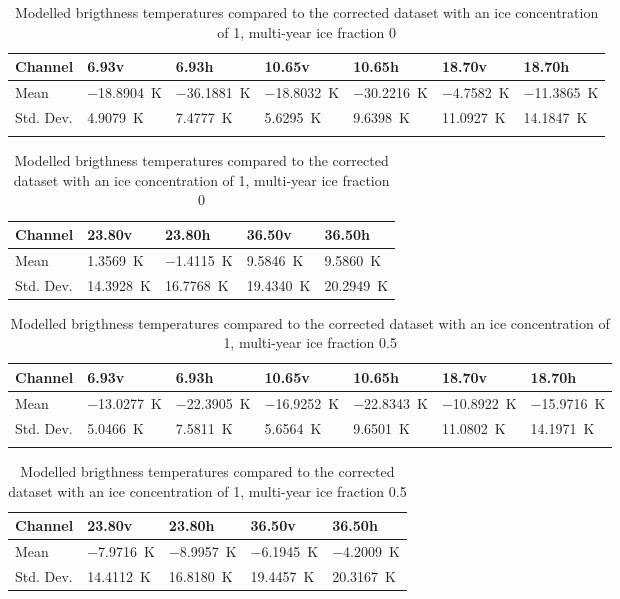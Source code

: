 \documentclass[11pt, a4paper]{article}
\begin{document}
\begin{table}[h!]
\centering
\begin{tabular}{@{} l l l l l l l @{}}
Channel & 6.93v & 6.93h & 10.65v & 10.65h & 18.70v & 18.70h \\
\midrule
Mean & \SI{-18.8904}{K} & \SI{-36.1881}{K} & \SI{-18.8032}{K} & \SI{-30.2216}{K} & \SI{-4.7582}{K} & \SI{-11.3865}{K} \\
Std. Dev. & \SI{4.9079}{K} & \SI{7.4777}{K} & \SI{5.6295}{K} & \SI{9.6398}{K} & \SI{11.0927}{K} & \SI{14.1847}{K} \\
\midrule
\tabularnewline
\end{tabular}
\begin{tabular}{@{} l l l l l @{}}
Channel & 23.80v & 23.80h & 36.50v & 36.50h \\
\midrule
Mean & \SI{1.3569}{K} & \SI{-1.4115}{K} & \SI{9.5846}{K} & \SI{9.5860}{K} \\
Std. Dev. & \SI{14.3928}{K} & \SI{16.7768}{K} & \SI{19.4340}{K} & \SI{20.2949}{K} \\
\midrule
\end{tabular}
\caption{Modelled brigthness temperatures compared to the corrected dataset with an ice concentration of 1, multi-year ice fraction 0}
\label{tab:for1_0}
\end{table}



\begin{table}[h!]
\centering
\begin{tabular}{@{} l l l l l l l @{}}
Channel & 6.93v & 6.93h & 10.65v & 10.65h & 18.70v & 18.70h \\
\midrule
Mean & \SI{-13.0277}{K} & \SI{-22.3905}{K} & \SI{-16.9252}{K} & \SI{-22.8343}{K} & \SI{-10.8922}{K} & \SI{-15.9716}{K} \\
Std. Dev. & \SI{5.0466}{K} & \SI{7.5811}{K} & \SI{5.6564}{K} & \SI{9.6501}{K} & \SI{11.0802}{K} & \SI{14.1971}{K} \\
\midrule
\tabularnewline
\end{tabular}
\begin{tabular}{@{} l l l l l @{}}
Channel & 23.80v & 23.80h & 36.50v & 36.50h \\
\midrule
Mean & \SI{-7.9716}{K} & \SI{-8.9957}{K} & \SI{-6.1945}{K} & \SI{-4.2009}{K} \\
Std. Dev. & \SI{14.4112}{K} & \SI{16.8180}{K} & \SI{19.4457}{K} & \SI{20.3167}{K} \\
\midrule
\end{tabular}
\caption{Modelled brigthness temperatures compared to the corrected dataset with an ice concentration of 1, multi-year ice fraction 0.5}
\label{tab:for1_5}
\end{table}
\end{document}
